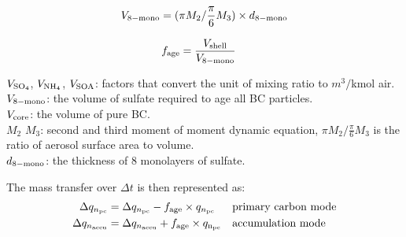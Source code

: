 \documentclass[12pt]{article}
\begin{document}
		 \begin{align}
		 \begin{split}
		 V_{\rm{8-mono}} = (\pi M_2/ \frac{\pi}{6}M_3) \times d_{\rm{8-mono}}
		 \end{split}
		 \end{align}
		 
		 \begin{align}
		 f_{\rm{age}} &= \frac{V_{\rm{shell}}}{V_{\rm{8-mono}}}  
		 \end{align}
		 
		 \begin{flushleft}
		 	$V_{\rm{SO_4}}$, $V_{\rm{NH_4}}$, $V_{\rm{SOA}}$: factors that convert the unit of mixing ratio to $m^3/$kmol air. \\
		 	$V_{\rm{8-mono}}$: the volume of sulfate required to age all BC particles. \\
		 	$V_{\rm{core}}$: the volume of pure BC. \\
		 	$M_2$ $M_3$: second and third moment of  moment dynamic equation, $\pi M_2/ \frac{\pi}{6}M_3$ is the ratio of aerosol surface area to volume. \\
		 	$d_{\rm{8-mono}}$: the thickness of 8 monolayers of sulfate.
		 \end{flushleft}
		 
		 The mass transfer over $\Delta t$ is then represented as:
		 \begin{align}
		 \Delta q_{n_{\rm{pc}}} &= \Delta q_{n_{\rm{pc}}} - f_{\rm{age}} \times q_{n_{\rm{pc}}}  &&\text{primary carbon mode} \\
		 \Delta q_{n_{\rm{accu}}} &= \Delta q_{n_{\rm{accu}}} + f_{\rm{age}} \times q_{\rm{n_{\rm{pc}}}}  &&\text{accumulation mode}
		 \end{align}
		 
		 
\end{document}
